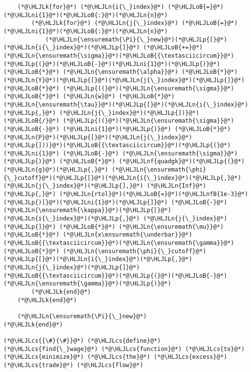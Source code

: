 \documentclass[12pt,a4paper]{article}
\newcommand{\HLJLk}[1]{\textcolor[RGB]{148,91,176}{\textbf{#1}}}
\newcommand{\HLJLn}[1]{#1}
\newcommand{\HLJLnf}[1]{\textcolor[RGB]{66,102,213}{#1}}
\newcommand{\HLJLnfB}[1]{\textcolor[RGB]{59,151,46}{#1}}
\newcommand{\HLJLni}[1]{\textcolor[RGB]{59,151,46}{#1}}
\newcommand{\HLJLoB}[1]{\textcolor[RGB]{102,102,102}{\textbf{#1}}}
\newcommand{\HLJLp}[1]{#1}
\newcommand{\HLJLcs}[1]{\textcolor[RGB]{153,153,119}{\textit{#1}}}
\begin{document}
\begin{lstlisting}
    (*@\HLJLk{for}@*) (*@\HLJLn{i{\_}index}@*) (*@\HLJLoB{=}@*) (*@\HLJLni{1}@*)(*@\HLJLoB{:}@*)(*@\HLJLn{n}@*)
        (*@\HLJLk{for}@*) (*@\HLJLn{j{\_}index}@*) (*@\HLJLoB{=}@*) (*@\HLJLni{1}@*)(*@\HLJLoB{:}@*)(*@\HLJLn{n}@*)
            (*@\HLJLn{\ensuremath{\Pi}{\_}new}@*)(*@\HLJLp{[}@*)(*@\HLJLn{i{\_}index}@*)(*@\HLJLp{]}@*) (*@\HLJLoB{+=}@*) (*@\HLJLn{\ensuremath{\sigma}}@*)(*@\HLJLoB{{\textasciicircum}}@*)(*@\HLJLp{(}@*)(*@\HLJLoB{-}@*)(*@\HLJLni{1}@*)(*@\HLJLp{)}@*) (*@\HLJLoB{*}@*) (*@\HLJLn{\ensuremath{\alpha}}@*) (*@\HLJLoB{*}@*) (*@\HLJLn{Y}@*)(*@\HLJLp{[}@*)(*@\HLJLn{j{\_}index}@*)(*@\HLJLp{]}@*) (*@\HLJLoB{*}@*) (*@\HLJLp{((}@*)(*@\HLJLn{\ensuremath{\sigma}}@*) (*@\HLJLoB{*}@*) (*@\HLJLn{w}@*) (*@\HLJLoB{*}@*) (*@\HLJLn{\ensuremath{\tau}}@*)(*@\HLJLp{[}@*)(*@\HLJLn{i{\_}index}@*)(*@\HLJLp{,}@*) (*@\HLJLn{j{\_}index}@*)(*@\HLJLp{])}@*) (*@\HLJLoB{/}@*) (*@\HLJLp{((}@*)(*@\HLJLn{\ensuremath{\sigma}}@*) (*@\HLJLoB{-}@*) (*@\HLJLni{1}@*)(*@\HLJLp{)}@*) (*@\HLJLoB{*}@*) (*@\HLJLn{P}@*)(*@\HLJLp{[}@*)(*@\HLJLn{j{\_}index}@*)(*@\HLJLp{]))}@*)(*@\HLJLoB{{\textasciicircum}}@*)(*@\HLJLp{(}@*)(*@\HLJLni{1}@*) (*@\HLJLoB{-}@*) (*@\HLJLn{\ensuremath{\sigma}}@*)(*@\HLJLp{)}@*) (*@\HLJLoB{*}@*) (*@\HLJLnf{quadgk}@*)(*@\HLJLp{(}@*)(*@\HLJLn{g}@*)(*@\HLJLp{,}@*) (*@\HLJLn{\ensuremath{\phi}{\_}cutoff}@*)(*@\HLJLp{[}@*)(*@\HLJLn{i{\_}index}@*)(*@\HLJLp{,}@*) (*@\HLJLn{j{\_}index}@*)(*@\HLJLp{],}@*) (*@\HLJLn{Inf}@*)(*@\HLJLp{,}@*) (*@\HLJLn{rtol}@*)(*@\HLJLoB{=}@*)(*@\HLJLnfB{1e-3}@*)(*@\HLJLp{)[}@*)(*@\HLJLni{1}@*)(*@\HLJLp{]}@*) (*@\HLJLoB{-}@*) (*@\HLJLn{\ensuremath{\kappa}}@*)(*@\HLJLp{[}@*)(*@\HLJLn{i{\_}index}@*)(*@\HLJLp{,}@*) (*@\HLJLn{j{\_}index}@*)(*@\HLJLp{]}@*) (*@\HLJLoB{*}@*) (*@\HLJLn{\ensuremath{\mu}}@*) (*@\HLJLoB{*}@*) (*@\HLJLn{x\ensuremath{\underbar}}@*)(*@\HLJLoB{{\textasciicircum}}@*)(*@\HLJLn{\ensuremath{\gamma}}@*) (*@\HLJLoB{*}@*) (*@\HLJLn{\ensuremath{\phi}{\_}cutoff}@*)(*@\HLJLp{[}@*)(*@\HLJLn{i{\_}index}@*)(*@\HLJLp{,}@*) (*@\HLJLn{j{\_}index}@*)(*@\HLJLp{]}@*)(*@\HLJLoB{{\textasciicircum}}@*)(*@\HLJLp{(}@*)(*@\HLJLoB{-}@*)(*@\HLJLn{\ensuremath{\gamma}}@*)(*@\HLJLp{)}@*)
        (*@\HLJLk{end}@*)
    (*@\HLJLk{end}@*)

    (*@\HLJLn{\ensuremath{\Pi}{\_}new}@*)
(*@\HLJLk{end}@*)

(*@\HLJLcs{{\#}{\#}}@*) (*@\HLJLcs{define}@*) (*@\HLJLcs{find{\_}wage}@*) (*@\HLJLcs{function}@*) (*@\HLJLcs{to}@*) (*@\HLJLcs{minimize}@*) (*@\HLJLcs{the}@*) (*@\HLJLcs{excess}@*) (*@\HLJLcs{trade}@*) (*@\HLJLcs{flow}@*)


\end{lstlisting}
\end{document}
